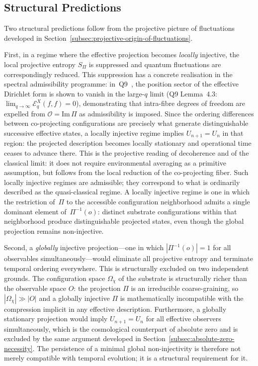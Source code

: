 \subsection{Structural Predictions}
  \label{subsec:structural-predictions-fluctuations}

  Two structural predictions follow from the projective picture of fluctuations developed
  in Section~\ref{subsec:projective-origin-of-fluctuations}.

  First, in a regime where the effective projection becomes \emph{locally} injective,
  the local projective entropy $S_\Pi$ is suppressed and quantum fluctuations are
  correspondingly reduced.
  This suppression has a concrete realisation in the spectral admissibility programme:
  in~Q9~\cite{Beau2026q9}, the position sector of the effective Dirichlet form is shown
  to vanish in the large-$q$ limit (Q9 Lemma~4.3: $\lim_{q\to\infty}\mathcal{E}^X_q(f,f) = 0$),
  demonstrating that intra-fibre degrees of freedom are expelled from
  $\mathcal{O} = \mathrm{Im}\,\Pi$ as admissibility is imposed.
  Since the ordering differences between co-projecting configurations are precisely
  what generate distinguishable successive effective states, a locally injective regime
  implies $U_{n+1} = U_n$ in that region: the projected description becomes locally
  stationary and operational time ceases to advance there.
  This is the projective reading of decoherence and of the classical limit: it does not
  require environmental averaging as a primitive assumption, but follows from the
  local reduction of the co-projecting fiber.
  Such locally injective regimes are admissible; they correspond to what is ordinarily
  described as the quasi-classical regime.
  A locally injective regime is one in which the restriction of~$\Pi$ to the accessible
  configuration neighborhood admits a single dominant element of~$\Pi^{-1}(o)$:
  distinct substrate configurations within that neighborhood produce distinguishable
  projected states, even though the global projection remains non-injective.

  Second, a \emph{globally} injective projection---one in which $|\Pi^{-1}(o)| = 1$
  for all observables simultaneously---would eliminate all projective entropy and
  terminate temporal ordering everywhere.
  This is structurally excluded on two independent grounds.
  The configuration space $\Omega_\chi$ of the substrate is structurally richer than the
  observable space $O$: the projection $\Pi$ is an irreducible coarse-graining, so
  $|\Omega_\chi| \gg |O|$ and a globally injective $\Pi$ is mathematically incompatible
  with the compression implicit in any effective description.
  Furthermore, a globally stationary projection would imply $U_{n+1} = U_n$ for all
  effective observers simultaneously, which is the cosmological counterpart of absolute
  zero and is excluded by the same argument developed in Section~\ref{subsec:absolute-zero-necessity}.
  The persistence of a minimal global non-injectivity is therefore not merely compatible
  with temporal evolution; it is a structural requirement for it.
